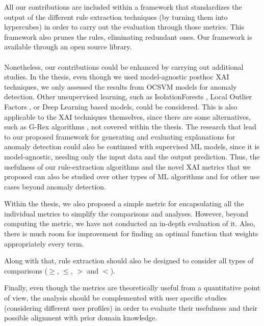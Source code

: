 All our contributions are included within a framework that standardizes the output of the different rule extraction techniques (by turning them into hypercubes) in order to carry out the evaluation through those metrics. This framework also prunes the rules, eliminating redundant ones. Our framework is available through an open source library.
\\
\\
Nonetheless, our contributions could be enhanced by carrying out additional studies. In the thesis, even though we used model-agnostic posthoc XAI techniques, we only assessed the results from OCSVM models for anomaly detection. Other unsupervised learning, such as IsolationForests \parencite{liu2008isolation}, Local Outlier Factors \parencite{breunig2000lof}, or Deep Learning based models, could be considered. This is also applicable to the XAI techniques themselves, since there are some alternatives, such as G-Rex algorithms \parencite{konig2008g}, not covered within the thesis. The research that lead to our proposed framework for generating and evaluating explanations for anomaly detection could also be continued with supervised ML models, since it is model-agnostic, needing only the input data and the output prediction. Thus, the usefulness of our rule-extraction algorithms and the novel XAI metrics that we proposed can also be studied over other types of ML algorithms and for other use cases beyond anomaly detection.

Within the thesis, we also proposed a simple metric for encapsulating all the individual metrics to simplify the comparisons and analyses. However, beyond computing the metric, we have not conducted an in-depth evaluation of it. Also, there is much room for improvement for finding an optimal function that weights appropriately every term.

Along with that, rule extraction should also be designed to consider all types of comparisons ($\geq$, $\leq$, $>$ and $<$).

Finally, even though the metrics are theoretically useful from a quantitative point of view, the analysis should be complemented with user specific studies (considering different user profiles) in order to evaluate their usefulness and their possible alignment with prior domain knowledge.

